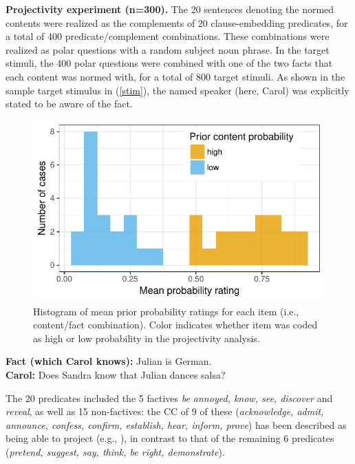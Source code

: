 \documentclass[12pt,fleqn]{article}
\newcommand{\6}{\mbox{$[\hspace*{-.6mm}[$}}
\newcommand{\9}{\mbox{$]\hspace*{-.6mm}]$}}
\begin{document}
\noindent 
{\bf Projectivity experiment (n=300).} The 20 sentences denoting the normed contents were realized as the complements of 20 clause-embedding predicates, for a total of 400 predicate/complement combinations. These combinations were realized as polar questions with a random subject noun phrase. In the target stimuli, the 400 polar questions were combined with one of the two facts that each content was normed with, for a total of 800 target stimuli. As shown in the sample target stimulus in (\ref{stim}), the named speaker (here, Carol) was explicitly stated to be aware of the fact.
\vspace*{-.6cm}
\begin{figure}
\centering
\includegraphics[width=.32\paperwidth]{../results/1-prior/graphs/meanprobratings}
\caption{Histogram of mean prior probability ratings for each item (i.e., content/fact combination). Color indicates whether item was coded as high or low probability in the projectivity analysis.}\label{f-prior}
\end{figure}%
\begin{exe}
\ex\label{stim}
{\bf Fact (which Carol knows):} Julian is German.  \\ 
{\bf Carol:} Does Sandra know that Julian dances salsa?
\end{exe}
\vspace*{-.15cm}
The 20 predicates included the 5 factives {\em be annoyed, know, see, discover} and {\em reveal}, as well as 15 non-factives: the CC of 9 of these ({\em acknowledge, admit, announce, confess, confirm, establish, hear, inform, prove}) has been described as being able to project (e.g., \citealt{schlenker10,anand-hacquard2014,spector-egre2015,tbd-variability}), in contrast to that of the remaining 6 predicates ({\em pretend, suggest, say, think, be right, demonstrate}).
\end{document}
